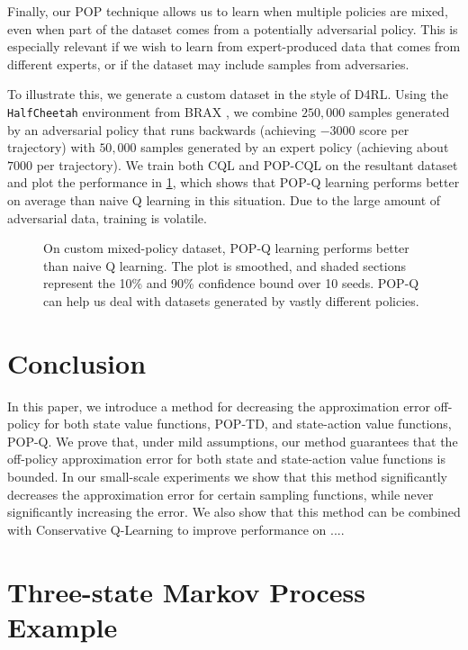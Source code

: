 Finally, our POP technique allows us to learn when multiple policies are mixed, even when part of the dataset comes from a potentially adversarial policy. This is especially relevant if we wish to learn from expert-produced data that comes from different experts, or if the dataset may include samples from adversaries.

To illustrate this, we generate a custom dataset in the style of D4RL. Using the \texttt{HalfCheetah} environment from BRAX \citep{brax2021github}, we combine $250,000$ samples generated by an adversarial policy that runs backwards (achieving $-3000$ score per trajectory) with $50,000$ samples generated by an expert policy (achieving about $7000$ per trajectory). We train both CQL and POP-CQL on the resultant dataset and plot the performance in \cref{fig:fwdback}, which shows that POP-Q learning performs better on average than naive Q learning in this situation. Due to the large amount of adversarial data, training is volatile.

\begin{figure}[t]
  \centering
  
  \caption{
    On custom mixed-policy dataset, POP-Q learning performs better than naive Q learning. The plot is smoothed, and shaded sections represent the 10\% and 90\% confidence bound over 10 seeds. POP-Q can help us deal with datasets generated by vastly different policies.
  }
  \label{fig:fwdback}
\end{figure}

\section{Conclusion}
In this paper, we introduce a method for decreasing the approximation error off-policy for both state value functions, POP-TD, and state-action value functions, POP-Q.
We prove that, under mild assumptions, our method guarantees that the off-policy approximation error for both state and state-action value functions is bounded.
In our small-scale experiments we show that this method significantly decreases the approximation error for certain sampling functions, while never significantly increasing the error.
We also show that this method can be combined with Conservative Q-Learning to improve performance on .... %

\section{Three-state Markov Process Example}
\label{app:threestate}

